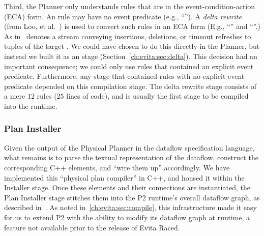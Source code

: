 
Third, the Planner only understands rules that are in the
event-condition-action (ECA) form.  An \OVERLOG rule may have no event
predicate (e.g., ``'').  A {\em delta rewrite}
(from Loo, et al.~\cite{loo-sigmod06}) is used to convert such rules in an ECA
form (E.g., ``'' and ``''.) As in~\cite{loo-sigmod06}  denotes
a stream conveying insertions, deletions, or timeout refreshes to tuples of the
target .  We could have chosen to do this directly in the Planner,
but instead we built it as an \OVERLOG stage
(Section~\ref{ch:evita:sec:delta}).  This decision had an important
consequence; we could only use rules that contained an explicit event
predicate.  Furthermore, any \OVERLOG stage that contained rules with no
explicit event predicate depended on this compilation stage.  The delta rewrite
\OVERLOG stage consists of a mere $12$ rules ($25$ lines of code), and is
usually the first \OVERLOG stage to be compiled into the runtime.
 

\subsubsection{Plan Installer}
\label{ch:evita:sec:installer}

Given the output of the Physical Planner in the dataflow specification
language, what remains is to parse the textual representation of the dataflow,
construct the corresponding C++ elements, and ``wire them up'' accordingly.  We
have implemented this ``physical plan compiler'' in C++, and housed it within
the Installer stage.  Once these elements and their connections are
instantiated, the Plan Installer stage stitches them into the P2 runtime's
overall dataflow graph, as described in~\cite{p2:sosp}.  As noted
in~\ref{ch:evita:sec:compile}, this infrastructure made it easy for us to
extend P2 with the ability to modify its dataflow graph at runtime, a feature
not available prior to the release of Evita Raced.

